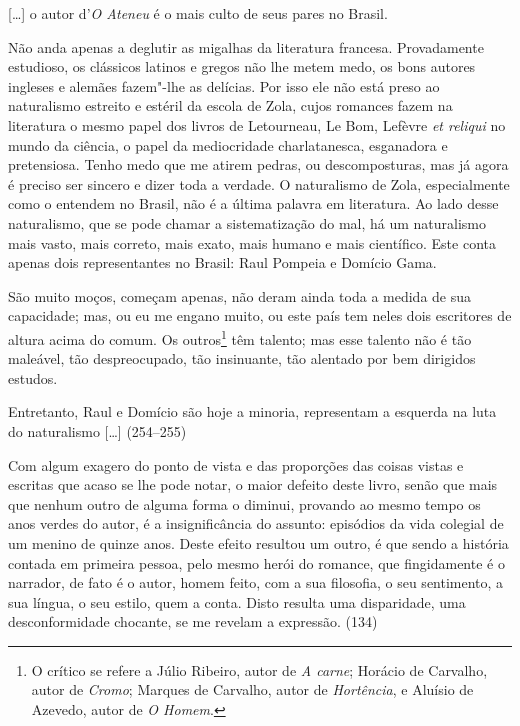 
[\ldots] o autor d'\textit{O Ateneu} é o mais culto de seus pares no Brasil.

Não anda apenas a deglutir as migalhas da literatura
francesa. Provadamente estudioso, os clássicos latinos e gregos não lhe
metem medo, os bons autores ingleses e alemães fazem"-lhe as delícias.
Por isso ele não está preso ao naturalismo estreito e estéril da escola
de Zola, cujos romances fazem na literatura o mesmo papel dos livros de
Letourneau, Le Bom, Lefèvre \textit{et reliqui} no mundo da ciência, o papel da mediocridade
charlatanesca, esganadora e pretensiosa. Tenho medo que me atirem
pedras, ou descomposturas, mas já agora é preciso ser sincero e dizer
toda a verdade. O naturalismo de Zola, especialmente como o entendem no
Brasil, não é a última palavra em literatura. Ao lado desse
naturalismo, que se pode chamar a sistematização do mal, há um
naturalismo mais vasto, mais correto, mais exato, mais humano e mais
científico. Este conta apenas dois representantes no Brasil: Raul
Pompeia e Domício Gama.

São muito moços, começam apenas, não deram ainda toda a
medida de sua capacidade; mas, ou eu me engano muito, ou este país tem
neles dois escritores de altura acima do comum. Os outros\footnote{O
crítico se refere a Júlio Ribeiro, autor de \textit{A carne}; Horácio
de Carvalho, autor de \textit{Cromo}; Marques de Carvalho, autor de
\textit{Hortência}, e Aluísio de Azevedo, autor de \textit{O Homem}.} 
têm talento; mas esse talento não é tão maleável, tão
despreocupado, tão insinuante, tão alentado por bem dirigidos estudos.

Entretanto, Raul e Domício são hoje a minoria, representam a esquerda na
luta do naturalismo [\ldots] (254--255)



Com algum exagero do ponto de vista e das proporções das coisas vistas e
escritas que acaso se lhe pode notar, o maior defeito deste livro,
senão que mais que nenhum outro de alguma forma o diminui, provando ao
mesmo tempo os anos verdes do autor, é a insignificância do assunto:
episódios da vida colegial de um menino de quinze anos. Deste efeito
resultou um outro, é que sendo a história contada em primeira pessoa,
pelo mesmo herói do romance, que fingidamente é o narrador, de fato é o
autor, homem feito, com a sua filosofia, o seu sentimento, a sua
língua, o seu estilo, quem a conta. Disto resulta uma disparidade, uma
desconformidade chocante, se me revelam a expressão. (134)

